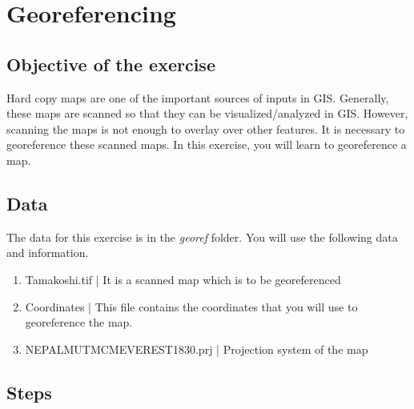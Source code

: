 \chapter{Georeferencing}
\section{Objective of the exercise}
Hard copy maps are one of the important sources of inputs in GIS. Generally, these maps are scanned so that they can be visualized/analyzed in GIS. However, scanning the maps is not enough to overlay over other features. It is necessary to georeference these scanned maps. In this exercise, you will learn to georeference a map.

\section{Data}
The data for this exercise is in the \emph{georef} folder. You will use the following data and information.
\begin{enumerate}
\item{Tamakoshi.tif | It is a scanned map which is to be georeferenced}
\item{Coordinates | This file contains the coordinates that you will use to georeference the map.}
\item{NEPAL\textunderscore MUTM\textunderscore CM\textunderscore EVEREST\textunderscore 1830.prj | Projection system of the map}
\end{enumerate}

\section{Steps}
